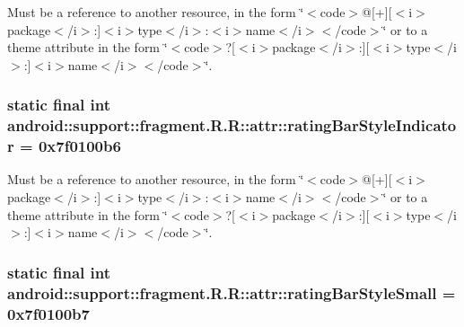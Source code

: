 Must be a reference to another resource, in the form \char`\"{}$<$code$>$@\mbox{[}+\mbox{]}\mbox{[}$<$i$>$package$<$/i$>$:\mbox{]}$<$i$>$type$<$/i$>$:$<$i$>$name$<$/i$>$$<$/code$>$\char`\"{} or to a theme attribute in the form \char`\"{}$<$code$>$?\mbox{[}$<$i$>$package$<$/i$>$:\mbox{]}\mbox{[}$<$i$>$type$<$/i$>$:\mbox{]}$<$i$>$name$<$/i$>$$<$/code$>$\char`\"{}. \hypertarget{classandroid_1_1support_1_1fragment_1_1_r_1_1attr_16c64a2a5d36029f474b305deca21c91}{
\subsubsection[{ratingBarStyleIndicator}]{\setlength{\rightskip}{0pt plus 5cm}static final int android::support::fragment.R.R::attr::ratingBarStyleIndicator = 0x7f0100b6}}
\label{classandroid_1_1support_1_1fragment_1_1_r_1_1attr_16c64a2a5d36029f474b305deca21c91}


Must be a reference to another resource, in the form \char`\"{}$<$code$>$@\mbox{[}+\mbox{]}\mbox{[}$<$i$>$package$<$/i$>$:\mbox{]}$<$i$>$type$<$/i$>$:$<$i$>$name$<$/i$>$$<$/code$>$\char`\"{} or to a theme attribute in the form \char`\"{}$<$code$>$?\mbox{[}$<$i$>$package$<$/i$>$:\mbox{]}\mbox{[}$<$i$>$type$<$/i$>$:\mbox{]}$<$i$>$name$<$/i$>$$<$/code$>$\char`\"{}. \hypertarget{classandroid_1_1support_1_1fragment_1_1_r_1_1attr_f6d3c6676a9fb6ce2ef58f4ef5b658db}{
\subsubsection[{ratingBarStyleSmall}]{\setlength{\rightskip}{0pt plus 5cm}static final int android::support::fragment.R.R::attr::ratingBarStyleSmall = 0x7f0100b7}}
\label{classandroid_1_1support_1_1fragment_1_1_r_1_1attr_f6d3c6676a9fb6ce2ef58f4ef5b658db}


